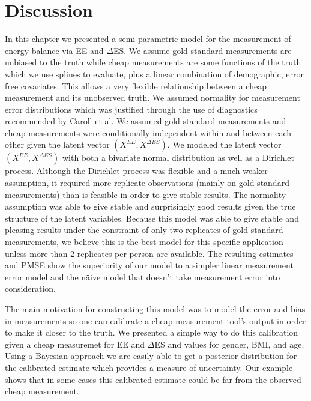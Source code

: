 \documentclass[11pt]{article}\usepackage[]{graphicx}\usepackage[]{color}
\begin{document}
  
  
\section{Discussion}

In this chapter we presented a semi-parametric model for the measurement of energy balance via EE and $\Delta$ES. We assume gold standard measurements are unbiased to the truth while cheap measurements are some functions of the truth which we use splines to evaluate, plus a linear combination of demographic, error free covariates. This allows a very flexible relationship between a cheap measurement and its unobserved truth. We assumed normality for measurement error distributions which was justified through the use of diagnostics recommended by Caroll et al. We assumed gold standard measurements and cheap measurements were conditionally independent within and between each other given the latent vector $(X^{EE},X^{\Delta ES})$. We modeled the latent vector $(X^{EE},X^{\Delta ES})$ with both a bivariate normal distribution as well as a Dirichlet process. Although the Dirichlet process was flexible and a much weaker assumption, it required more replicate observations (mainly on gold standard measurements) than is feasible in order to give stable results. The normality assumption was able to give stable and surprisingly good results given the true structure of the latent variables. Because this model was able to give stable and pleasing results under the constraint of only two replicates of gold standard measurements, we believe this is the best model for this specific application unless more than 2 replicates per person are available. The resulting estimates and PMSE show the superiority of our model to a simpler linear measurement error model and the n{\"a}ive model that doesn't take measurement error into consideration. 

The main motivation for constructing this model was to model the error and bias in measurements so one can calibrate a cheap measurement tool's output in order to make it closer to the truth. We presented a simple way to do this calibration given a cheap measuremet for EE and $\Delta$ES and values for gender, BMI, and age. Using a Bayesian approach we are easily able to get a posterior distribution for the calibrated estimate which provides a measure of uncertainty. Our example shows that in some cases this calibrated estimate could be far from the observed cheap measurement. 
\end{document}
